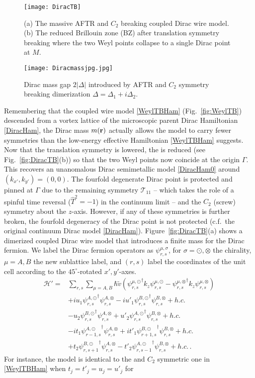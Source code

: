 \begin{figure}[htbp]
	\centering\texttt{[image: DiracTB]}
	\caption[(a) The massive AFTR and $C_2$ breaking coupled Dirac wire model. (b) The reduced Brillouin zone (BZ).]{(a) The massive AFTR and $C_2$ breaking coupled Dirac wire model. (b) The reduced Brillouin zone (BZ) after translation symmetry breaking where the two Weyl points collapse to a single Dirac point at $M$.}\label{fig:DiracTB}
	\centering\texttt{[image: Diracmassjpg.jpg]}
	\caption{Dirac mass gap $2|\Delta|$ introduced by AFTR and $C_2$ symmetry breaking dimerization $\Delta=\Delta_1+i\Delta_2$.}\label{fig:Diracmassjpg}
\end{figure}

Remembering that the coupled wire model \eqref{WeylTBHam} (Fig.~\ref{fig:WeylTB}) descended from a vortex lattice of the microscopic parent Dirac Hamiltonian \eqref{DiracHam}, the Dirac mass $m({\bf r})$ actually allows the model to carry fewer symmetries than the low-energy effective Hamiltonian \eqref{WeylTBHam} suggests. Now that the translation symmetry is lowered, the \BZ is reduced (see Fig.~\ref{fig:DiracTB}(b)) so that the two Weyl points now coincide at the origin $\Gamma$. This recovers an unanomalous Dirac semimetallic model \eqref{DiracHam0} around $(k_{x'},k_{y'})=(0,0)$. The fourfold degenerate Dirac point is protected and pinned at $\Gamma$ due to the remaining \AFTR symmetry $\mathcal{T}_{11}$ -- which takes the role of a spinful time reversal ($\hat{T}^2=-1$) in the continuum limit -- and the $C_2$ (screw) symmetry about the $z$-axis. However, if any of these symmetries is further broken, the fourfold degeneracy of the Dirac point is not protected (c.f.~the original continuum Dirac model \eqref{DiracHam}). Figure~\ref{fig:DiracTB}(a) shows a dimerized coupled Dirac wire model that introduces a finite mass for the Dirac fermion. We label the Dirac fermion operators as $\psi_{r,s}^{\mu,\sigma}$, for $\sigma=\odot,\otimes$ the chirality, $\mu=A,B$ the new sublattice label, and $(r,s)$ label the coordinates of the unit cell according to the $45^\circ$-rotated $x',y'$-axes. \begin{align}\mathcal{H}'=&\sum_{r,s}\sum_{\mu=A,B}\hbar\tilde{v}\left({\psi_{r,s}^{\mu,\odot}}^\dagger k_z\psi_{r,s}^{\mu,\odot}-{\psi_{r,s}^{\mu,\otimes}}^\dagger k_z\psi_{r,s}^{\mu,\otimes}\right)\nonumber\\&+iu_1{\psi_{r,s}^{A,\odot}}^\dagger\psi_{r,s}^{A,\otimes}-iu'_1{\psi_{r,s}^{B,\odot}}^\dagger\psi_{r,s}^{B,\otimes}+h.c.\nonumber\\&-u_2{\psi_{r,s}^{B,\odot}}^\dagger\psi_{r,s}^{A,\otimes}+u'_2{\psi_{r,s}^{A,\odot}}^\dagger\psi_{r,s}^{B,\otimes}+h.c.\label{DiracTBHam}\\&-it_1{\psi_{r-1,s}^{A,\odot}}^\dagger\psi_{r,s}^{A,\otimes}+it'_1{\psi_{r+1,s}^{B,\odot}}^\dagger\psi_{r,s}^{B,\otimes}+h.c.\nonumber\\&+t_2{\psi_{r,s+1}^{B,\odot}}^\dagger\psi_{r,s}^{A,\otimes}-t'_2{\psi_{r,s-1}^{A,\odot}}^\dagger\psi_{r,s}^{B,\otimes}+h.c.\nonumber \,.\end{align} For instance, the model is identical to the \AFTR and $C_2$ symmetric one in \eqref{WeylTBHam} when $t_j=t'_j=u_j=u'_j$ for 